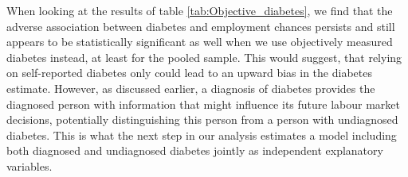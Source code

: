 When looking at the results of table \ref{tab:Objective_diabetes},
we find that the adverse association between diabetes and employment
chances persists and still appears to be statistically significant
as well when we use objectively measured diabetes instead, at least
for the pooled sample. This would suggest, that relying on self-reported
diabetes only could lead to an upward bias in the diabetes estimate.
However, as discussed earlier, a diagnosis of diabetes provides the
diagnosed person with information that might influence its future
labour market decisions, potentially distinguishing this person from
a person with undiagnosed diabetes. This is what the next step in
our analysis estimates a model including both diagnosed and undiagnosed
diabetes jointly as independent explanatory variables.

\begin{table}[h!]
\end{table}
